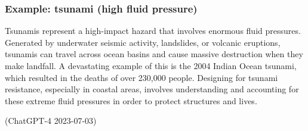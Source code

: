 \subsubsection{Example: tsunami (high fluid pressure)}
\begin{quoting}
    Tsunamis represent a high-impact hazard that involves enormous fluid pressures. Generated by underwater seismic activity, landslides, or volcanic eruptions, tsunamis can travel across ocean basins and cause massive destruction when they make landfall. A devastating example of this is the 2004 Indian Ocean tsunami, which resulted in the deaths of over 230,000 people. Designing for tsunami resistance, especially in coastal areas, involves understanding and accounting for these extreme fluid pressures in order to protect structures and lives.

    (ChatGPT-4 2023-07-03)
\end{quoting}